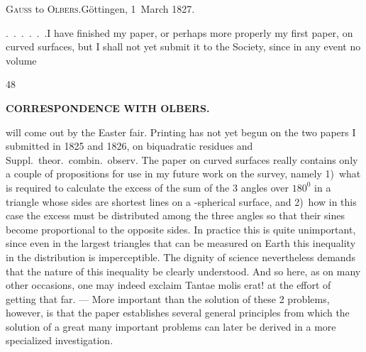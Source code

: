 \begin{center}
\textsc{Gauss} to \textsc{Olbers}.\quad Göttingen, 1~March 1827.
\end{center}

\par\noindent\hspace*{\parindent}\mbox{.\ .\ .\ .\ .\ .}\quad I have finished my paper, or perhaps more properly my first paper, on curved surfaces, but I shall not yet submit it to the Society, since in any event no volume
\par\smallskip\noindent{}\hfill{\footnotesize48}\hspace*{0.14\linewidth}\par
\clearpage
\noindent{}\hfill{\small\textbf{CORRESPONDENCE WITH OLBERS.}}\hfill\null\par\medskip
\noindent will come out by the Easter fair.
Printing has not yet begun on the two papers I submitted in 1825 and 1826, on biquadratic residues and Suppl.\ theor.\ combin.\ observ.
The paper on curved surfaces really contains only a couple of propositions for  use in my future work on the survey, namely 1)~what is required to calculate the excess of the sum of the 3 angles over \(180^{0}\) in a triangle whose sides are shortest lines on a -spherical surface, and 2)~how in this case the excess must be distributed  among the three angles so that their sines become proportional to the opposite sides.
In practice this is quite unimportant, since even in the largest triangles that can be measured on Earth this inequality in the distribution is imperceptible. The dignity of science nevertheless demands that the nature of this inequality be clearly understood.
And so here, as on many other occasions, one may indeed exclaim Tantae molis erat! at the effort of getting that far. ---
More important than the solution of these 2 problems, however, is that the paper establishes several general principles from which the solution of a great many important problems can later be derived in a more specialized investigation.

